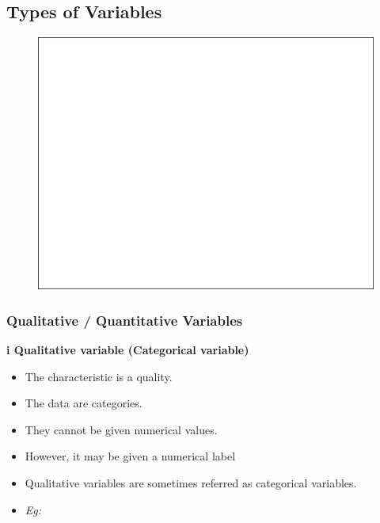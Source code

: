 \documentclass[]{book}
\providecommand{\tightlist}{%
  \setlength{\itemsep}{0pt}\setlength{\parskip}{0pt}}
\begin{document}
\hypertarget{types-of-variables}{%
\subsection{Types of Variables}\label{types-of-variables}}

\begin{figure}

{\centering \includegraphics[width=1\linewidth]{figure/box2-1} 

}

\end{figure}

\hypertarget{qualitative-quantitative-variables}{%
\subsubsection{Qualitative / Quantitative Variables}\label{qualitative-quantitative-variables}}

\textbf{i Qualitative variable (Categorical variable)}

\begin{itemize}
\tightlist
\item
  The characteristic is a quality.
\item
  The data are categories.
\item
  They cannot be given numerical values.
\item
  However, it may be given a numerical label
\item
  Qualitative variables are sometimes referred as categorical variables.
\item
  \emph{Eg:}
\end{itemize}
\end{document}
